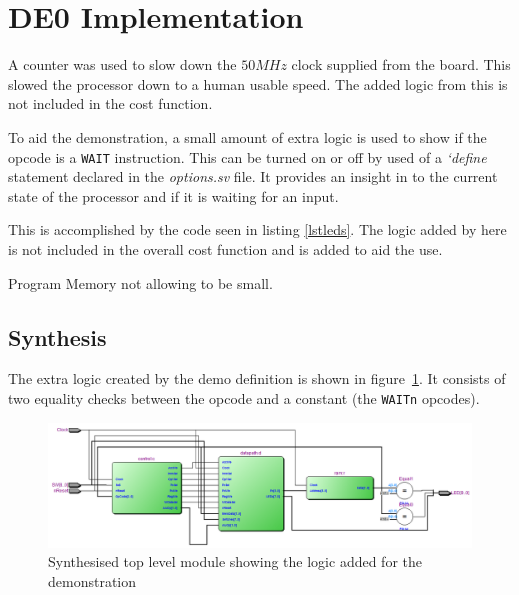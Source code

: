 
\section{DE0 Implementation}



A counter was used to slow down the $50MHz$ clock supplied from the board. 
This slowed the processor down to a human usable speed.
The added logic from this is not included in the cost function.


To aid the demonstration, a small amount of extra logic is used to show if the opcode is a \texttt{WAIT} instruction. 
This can be turned on or off by used of a \textit{`define} statement declared in the \textit{options.sv} file.
It provides an insight in to the current state of the processor and if it is waiting for an input.

This is accomplished by the code seen in listing \ref{lstleds}.
The logic added by here is not included in the overall cost function and is added to aid the use. 





Program Memory not allowing to be small. 


\subsection{Synthesis}

The extra logic created by the demo definition is shown in figure~\ref{fig:cpudemosynth}.
It consists of two equality checks between the opcode and a constant (the \texttt{WAITn} opcodes).



\begin{figure}
\includegraphics[width=\textwidth]{Figures/cpudemosynth.png}
\caption{Synthesised top level module showing the logic added for the demonstration}
\label{fig:cpudemosynth}
\end{figure}

